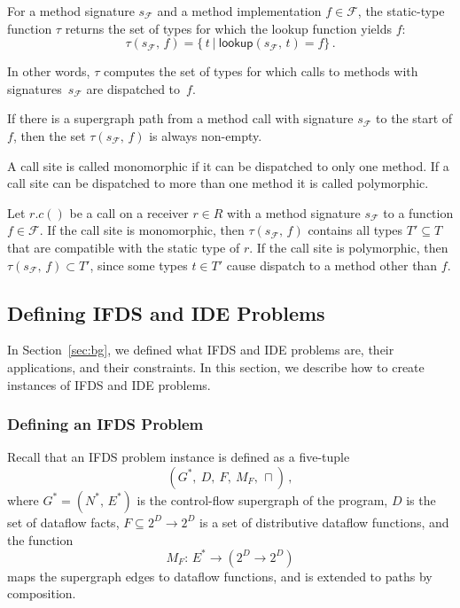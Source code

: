 \begin{definition}
  For a method signature $s_\mathcal F$ and a method implementation $f\in\mathcal F$, the static-type function $\tau$ returns the set of types for which the lookup function yields $f$:
  \begin{equation}
    \tau(s_\mathcal F,\,f)=\{\,t\ |\ \textsf{lookup}(s_\mathcal F,\,t)=f\}\,.
  \end{equation}
\end{definition}
In other words, $\tau$ computes the set of types for which calls to methods
with signatures~$s_\mathcal F$ are dispatched to~$f$.

If there is a supergraph path from a method call with signature $s_\mathcal F$ to the start of $f$, then the set $\tau(s_\mathcal F,\,f)$ is always non-empty.

\begin{definition}\label{def:momopoly}
  A call site is called monomorphic if it can be dispatched to only one method. If a call site can be dispatched to more than one method it is called polymorphic.
\end{definition}

  Let $r.c()$ be a call on a receiver $r\in R$ with a method signature $s_\mathcal F$ to a function $f\in\mathcal F$.
  If the call site is monomorphic, then $\tau(s_\mathcal F,\,f)$ contains all types $T'\subseteq T$ that are compatible with the static type of $r$.
  If the call site is polymorphic, then $\tau(s_\mathcal F,\,f)\subset T'$, since some types $t\in T'$ cause dispatch to a method other than $f$.

\subsection{Defining IFDS and IDE Problems}
In Section~\ref{sec:bg}, we defined what IFDS and IDE problems are, their applications, and their constraints. In this section, we describe how to create instances of IFDS and IDE problems.

\subsubsection{Defining an IFDS Problem}\label{sec:ifdsdef}
Recall that an IFDS problem instance is defined as a five-tuple
\[
    (G^*,\ D,\ F,\ M_F,\,\sqcap)\,,
\]
where $G^*=(N^*,\,E^*)$ is the control-flow supergraph of the program, $D$ is the set of dataflow facts, $F\subseteq2^D\to2^D$ is a set of distributive dataflow functions, and the function $$M_F:\,E^*\to(2^D\to2^D)$$ maps the supergraph edges to dataflow functions, and is extended to paths by composition.

